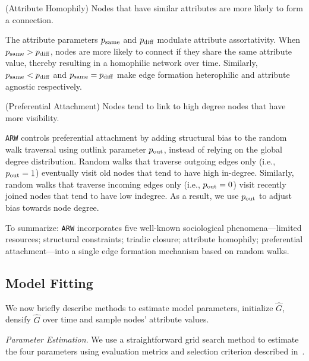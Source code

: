 \begin{ph}
	(Attribute Homophily) Nodes that have similar attributes are more likely
	to form a connection. \cite{mcpherson2001birds}
\end{ph}
The attribute parameters $p_{\scriptsize\mbox{same}}$ and $p_{\scriptsize\mbox{diff}}$ modulate
attribute assortativity. When $p_{\scriptsize\mbox{same}} > p_{\scriptsize\mbox{diff}}$, nodes are more likely to connect if they share
the same attribute value, thereby resulting in a homophilic network over time. Similarly,
$p_{\scriptsize\mbox{same}} < p_{\scriptsize\mbox{diff}}$ and $p_{\scriptsize\mbox{same}}=p_{\scriptsize\mbox{diff}}$ make edge formation heterophilic and attribute agnostic respectively.

\begin{ph}
	(Preferential Attachment) Nodes tend to link to high degree nodes that have more
	visibility. \cite{barabasi1999emergence}
\end{ph}
\texttt{ARW} controls preferential attachment by adding structural bias to the
random walk traversal using outlink parameter $p_{\scriptsize\mbox{out}}$, instead of relying on the
global degree distribution. Random walks that traverse outgoing edges only
(i.e., $p_{\scriptsize\mbox{out}} =1$) eventually visit old nodes that tend to have high in-degree.
Similarly, random walks that traverse incoming edges only (i.e., $p_{\scriptsize\mbox{out}}=0$) visit
recently joined nodes that tend to have low indegree. As a result, we use
$p_{\scriptsize\mbox{out}}$ to adjust bias towards node degree.

To summarize: \texttt{ARW} incorporates five well-known sociological
phenomena---limited resources; structural constraints; triadic closure;
attribute homophily; preferential attachment---into a single edge formation
mechanism based on random walks.


\subsection{Model Fitting}
\label{sub:Model Fitting}

We now briefly describe methods to estimate model parameters,
initialize $\hat{G}$, densify $\hat{G}$ over time and sample nodes' attribute values.

\textit{Parameter Estimation}. We use a straightforward grid search method to estimate
the four parameters using evaluation metrics and selection criterion described in~.

